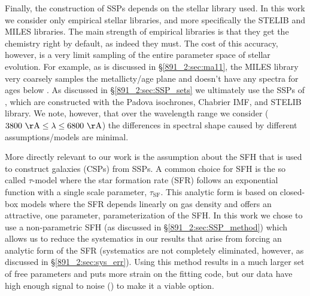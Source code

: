 Finally, the construction of SSPs depends on the stellar library
used. In this work we consider only empirical stellar libraries, and
more specifically the STELIB \citep{LeBorgne03} and MILES
\citep{Sanchez-Blazquez06} libraries. The main strength of empirical
libraries is that they get the chemistry right by default, as indeed
they must. The cost of this accuracy, however, is a very limit
sampling of the entire parameter space of stellar evolution. For
example, as is discussed in \S\ref{891_2:sec:ma11}, the MILES library
very coarsely samples the metallicty/age plane and doesn't have any
spectra for ages below . 
As discussed in \S\ref{891_2:sec:SSP_sets} we ultimately use the SSPs
of \citet{Bruzual03}, which are constructed with the Padova
isochrones, Chabrier IMF, and STELIB library. We note, however, that
over the wavelength range we consider ($\val{3800}{\AA}
\leq\lambda\leq \val{6800}{\AA}$) the differences in spectral shape
caused by different assumptions/models are minimal.

More directly relevant to our work is the assumption about the SFH
that is used to construct galaxies (CSPs) from SSPs. A common choice
for SFH is the so called $\tau$-model where the star formation rate
(SFR) follows an exponential function with a single scale parameter,
$\tau_\mathrm{SF}$. This analytic form is based on closed-box models
where the SFR depends linearly on gas density \citep{Schmidt59} and
offers an attractive, one parameter, parameterization of the SFH. In
this work we chose to use a non-parametric SFH (as discussed in
\S\ref{891_2:sec:SSP_method}) which allows us to reduce the
systematics in our results that arise from forcing an analytic form of
the SFR (systematics are not completely eliminated, however, as
discussed in \S\ref{891_2:sec:sys_err}). Using this method results in
a much larger set of free parameters and puts more strain on the
fitting code, but our data have high enough signal to noise
() to make it a viable option.

